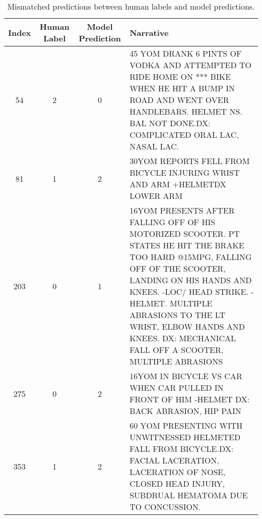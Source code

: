 \begin{table}
\caption{Mismatched predictions between human labels and model predictions.}
\label{tab:mismatches}
\begin{tabular}{cccp{8cm}}
\toprule
Index & Human Label & Model Prediction & Narrative \\
\midrule
54 & 2 & 0 & 45 YOM DRANK 6 PINTS OF VODKA AND ATTEMPTED TO RIDE HOME ON *** BIKE WHEN HE HIT A BUMP IN ROAD AND WENT OVER HANDLEBARS.  HELMET NS. BAL NOT DONE.DX:  COMPLICATED ORAL LAC, NASAL LAC. \\
81 & 1 & 2 & 30YOM REPORTS FELL FROM BICYCLE INJURING WRIST AND ARM  +HELMETDX LOWER ARM \\
203 & 0 & 1 & 16YOM PRESENTS AFTER FALLING OFF OF HIS MOTORIZED SCOOTER. PT STATES HE HIT THE BRAKE TOO HARD @15MPG, FALLING OFF OF THE SCOOTER, LANDING ON HIS HANDS AND KNEES. -LOC/ HEAD STRIKE. -HELMET. MULTIPLE ABRASIONS TO THE LT WRIST, ELBOW HANDS AND KNEES. DX: MECHANICAL FALL OFF A SCOOTER, MULTIPLE ABRASIONS \\
275 & 0 & 2 & 16YOM IN BICYCLE VS CAR WHEN CAR PULLED IN FRONT OF HIM -HELMET DX: BACK ABRASION, HIP PAIN \\
353 & 1 & 2 & 60 YOM PRESENTING WITH UNWITNESSED HELMETED FALL FROM BICYCLE.DX: FACIAL LACERATION, LACERATION OF NOSE, CLOSED HEAD INJURY, SUBDRUAL HEMATOMA DUE TO CONCUSSION. \\
\bottomrule
\end{tabular}
\end{table}
